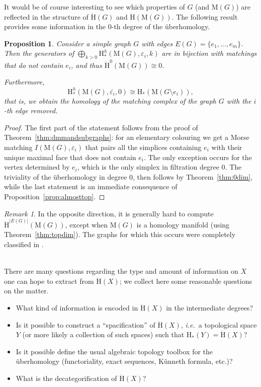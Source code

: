 \documentclass[11pt, a4paper, reqno, twoside, makeidx]{amsart}
\theoremstyle{remark}
\newtheorem{rmk}{Remark}[section]
\theoremstyle{plain}
\newtheorem{prop}[thm]{Proposition}
\theoremstyle{definition}
\newcommand{\HH}{\mathrm{H}}
\newcommand{\Mat}{\mathrm{M}}
\newcommand{\uH}{\ddot{\mathrm{H}}}
\begin{document}
It would be of course interesting to see which properties of $G$ (and $\Mat (G)$) are reflected in the structure of $\uH(G)$ and  $\uH(\Mat (G))$. The following result provides some information in the $0$-th degree of the \"uberhomology.
\begin{prop}\label{prop:uberofgraphs}
Consider a simple graph $G$ with edges $E(G) = \{e_1, \ldots, e_m\}$. Then the generators of  $\displaystyle \bigoplus_{k >0} \HH^h_*(\Mat (G),\varepsilon_i, k)$  are in bijection with matchings that do not contain $e_i$, and thus $\uH^0(\Mat (G)) \cong 0$. 

Furthermore, $$\HH^h_*(\Mat (G), \overline{\varepsilon_i},0) \cong \HH_*(\Mat (G\setminus e_i)),$$ that is, we obtain the homology of the matching complex of the graph $G$ with the $i$-th edge removed. 
\end{prop}
\begin{proof}
The first part of the statement follows from the proof of Theorem~\ref{thm:dmmandsubgraphs}: for an elementary colouring we get a Morse matching $I(\Mat (G), \varepsilon_i)$ that pairs all the simplices containing $e_i$ with their unique maximal face that does not contain $e_i$. The only exception occurs for the vertex determined by $e_i$, which is the only simplex in filtration degree $0$. The triviality of the \"uberhomology in degree $0$, then follows by Theorem~\ref{thm:0dim}, while the last statement is an immediate consequence of Proposition~\ref{prop:almosttop}.
\end{proof}

\begin{rmk}
In the opposite direction, it is generally hard to compute $\uH^{|E(G)|}(\Mat (G))$, except when $\Mat (G)$ is a homology manifold (using Theorem~\ref{thm:topdim}). The graphs for which this occurs were completely classified in \cite{bayer2020manifold}.
\end{rmk}

~\\
There are many questions regarding the type and amount of information on $X$ one can hope to extract from $\uH(X)$; we collect here some reasonable questions on the matter.
\begin{itemize}
\item What kind of information is encoded in $\uH(X)$ in the intermediate degrees? 
\item Is it possible to construct a ``spacification'' of $\uH(X)$, \emph{i.e.}~a topological space $Y$ (or more likely a collection of such spaces) such that $\mathrm{H}_*(Y) = \ddot{\mathrm{H}}(X)$? 
\item Is it possible define the usual algebraic topology toolbox for the \"uberhomology (functoriality, exact sequences, K\"unneth formula, etc.)?
\item What is the decategorification of $\uH(X)$?
\end{itemize}
\end{document}
